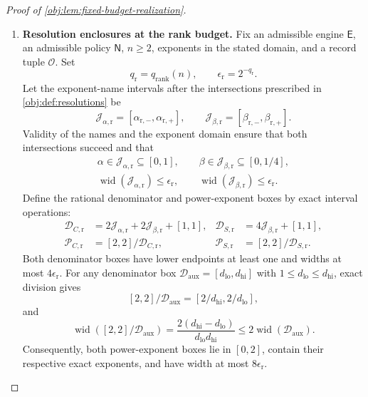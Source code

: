 \documentclass[11pt]{article}
\begin{document}
\begin{proof}[Proof of \cref{obj:lem:fixed-budget-realization}]
\begin{enumerate}
\item \textbf{Resolution enclosures at the rank budget.}
Fix an admissible engine \(\mathsf E\), an admissible policy \(\mathsf N\), \(n\ge2\), exponents in the stated domain, and a record tuple \(\mathcal O\). Set
\[
q_{\mathrm r}=q_{\mathrm{rank}}(n),
\qquad
\epsilon_{\mathrm r}=2^{-q_{\mathrm r}}.
\]
Let the exponent-name intervals after the intersections prescribed in \cref{obj:def:resolutions} be
\[
\mathcal J_{\alpha,\mathrm r}
=[\alpha_{\mathrm r,-},\alpha_{\mathrm r,+}],
\qquad
\mathcal J_{\beta,\mathrm r}
=[\beta_{\mathrm r,-},\beta_{\mathrm r,+}].
\]
Validity of the names and the exponent domain ensure that both intersections succeed and that
\[
\begin{gathered}
\alpha\in\mathcal J_{\alpha,\mathrm r}\subseteq[0,1],
\qquad
\beta\in\mathcal J_{\beta,\mathrm r}\subseteq[0,1/4],\\
\operatorname{wid}(\mathcal J_{\alpha,\mathrm r})\le\epsilon_{\mathrm r},
\qquad
\operatorname{wid}(\mathcal J_{\beta,\mathrm r})\le\epsilon_{\mathrm r}.
\end{gathered}
\]
Define the rational denominator and power-exponent boxes by exact interval operations:
\[
\begin{aligned}
\mathcal D_{C,\mathrm r}
&=2\mathcal J_{\alpha,\mathrm r}
  +2\mathcal J_{\beta,\mathrm r}+[1,1],
&
\mathcal D_{S,\mathrm r}
&=4\mathcal J_{\beta,\mathrm r}+[1,1],\\
\mathcal P_{C,\mathrm r}
&=[2,2]/\mathcal D_{C,\mathrm r},
&
\mathcal P_{S,\mathrm r}
&=[2,2]/\mathcal D_{S,\mathrm r}.
\end{aligned}
\]
Both denominator boxes have lower endpoints at least one and widths at most \(4\epsilon_{\mathrm r}\). For any denominator box
\(\mathcal D_{\mathrm{aux}}=[d_{\mathrm{lo}},d_{\mathrm{hi}}]\) with
\(1\le d_{\mathrm{lo}}\le d_{\mathrm{hi}}\), exact division gives
\[
[2,2]/\mathcal D_{\mathrm{aux}}
=
[2/d_{\mathrm{hi}},2/d_{\mathrm{lo}}],
\]
and
\[
\operatorname{wid}([2,2]/\mathcal D_{\mathrm{aux}})
=
\frac{2(d_{\mathrm{hi}}-d_{\mathrm{lo}})}
     {d_{\mathrm{lo}}d_{\mathrm{hi}}}
\le2\operatorname{wid}(\mathcal D_{\mathrm{aux}}).
\]
Consequently, both power-exponent boxes lie in \([0,2]\), contain their respective exact exponents, and have width at most \(8\epsilon_{\mathrm r}\).


\end{enumerate}
\end{proof}
\end{document}
